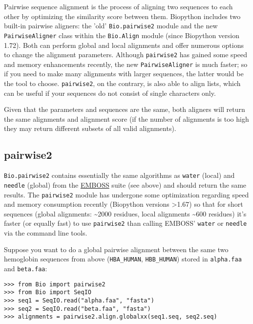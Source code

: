 Pairwise sequence alignment is the process of aligning two sequences to each
other by optimizing the similarity score between them. Biopython includes two
built-in pairwise aligners: the 'old' \verb|Bio.pairwise2| module and the new
\verb|PairwiseAligner| class within the \verb|Bio.Align| module (since Biopython
version 1.72). Both can perform global and local alignments and offer numerous
options to change the alignment parameters. Although \verb|pairwise2| has gained
some speed and memory enhancements recently, the new \verb|PairwiseAligner| is
much faster; so if you need to make many alignments with larger sequences, the
latter would be the tool to choose. \verb|pairwise2|, on the contrary, is also
able to align lists, which can be useful if your sequences do not consist of
single characters only. 

Given that the parameters and sequences are the same, both aligners will return
the same alignments and alignment score (if the number of alignments is too high
they may return different subsets of all valid alignments).

\subsection{pairwise2}
\label{sec:pairwise2}

\verb|Bio.pairwise2| contains essentially the same algorithms as
\texttt{water} (local) and \texttt{needle} (global) from the
\href{http://emboss.sourceforge.net/}{EMBOSS} suite (see above) and should
return the same results. The \verb|pairwise2| module has undergone some
optimization regarding speed and memory consumption recently (Biopython versions
\textgreater 1.67) so that for short sequences (global alignments:
\textasciitilde 2000 residues, local alignments \textasciitilde 600 residues)
it's faster (or equally fast) to use \verb|pairwise2| than calling EMBOSS' 
\texttt{water} or \texttt{needle} via the command line tools.

Suppose you want to do a global pairwise alignment between the same two
hemoglobin sequences from above (\texttt{HBA\_HUMAN}, \texttt{HBB\_HUMAN})
stored in \texttt{alpha.faa} and \texttt{beta.faa}:

\begin{verbatim}
>>> from Bio import pairwise2
>>> from Bio import SeqIO
>>> seq1 = SeqIO.read("alpha.faa", "fasta")
>>> seq2 = SeqIO.read("beta.faa", "fasta")
>>> alignments = pairwise2.align.globalxx(seq1.seq, seq2.seq)
\end{verbatim}

